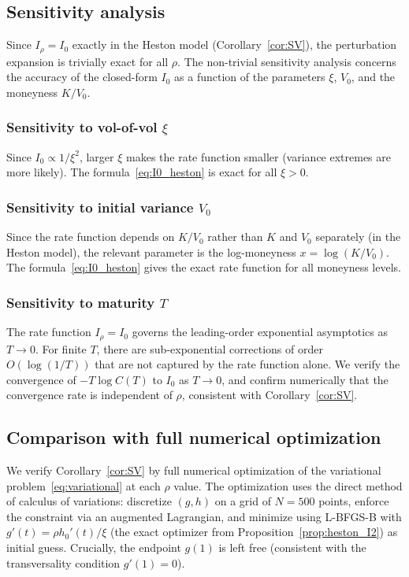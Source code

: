 \documentclass[11pt]{article}
\theoremstyle{definition}
\begin{document}
\subsection{Sensitivity analysis}\label{sec:sensitivity}

Since $I_\rho = I_0$ exactly in the Heston model (Corollary~\ref{cor:SV}), the perturbation expansion is trivially exact for all $\rho$. The non-trivial sensitivity analysis concerns the accuracy of the closed-form $I_0$ as a function of the parameters $\xi$, $V_0$, and the moneyness $K/V_0$.

\subsubsection{Sensitivity to vol-of-vol $\xi$}

Since $I_0 \propto 1/\xi^2$, larger $\xi$ makes the rate function smaller (variance extremes are more likely). The formula~\eqref{eq:I0_heston} is exact for all $\xi > 0$.

\subsubsection{Sensitivity to initial variance $V_0$}

Since the rate function depends on $K/V_0$ rather than $K$ and $V_0$ separately (in the Heston model), the relevant parameter is the log-moneyness $x = \log(K/V_0)$. The formula~\eqref{eq:I0_heston} gives the exact rate function for all moneyness levels.

\subsubsection{Sensitivity to maturity $T$}

The rate function $I_\rho = I_0$ governs the leading-order exponential asymptotics as $T \to 0$. For finite $T$, there are sub-exponential corrections of order $O(\log(1/T))$ that are not captured by the rate function alone. We verify the convergence of $-T\log C(T)$ to $I_0$ as $T \to 0$, and confirm numerically that the convergence rate is independent of $\rho$, consistent with Corollary~\ref{cor:SV}.

\subsection{Comparison with full numerical optimization}\label{sec:full_numerical}

We verify Corollary~\ref{cor:SV} by full numerical optimization of the variational problem~\eqref{eq:variational} at each $\rho$ value. The optimization uses the direct method of calculus of variations: discretize $(g, h)$ on a grid of $N = 500$ points, enforce the constraint via an augmented Lagrangian, and minimize using L-BFGS-B with $g'(t) = \rho h_0'(t)/\xi$ (the exact optimizer from Proposition~\ref{prop:heston_I2}) as initial guess. Crucially, the endpoint $g(1)$ is left free (consistent with the transversality condition $g'(1) = 0$).
\end{document}
